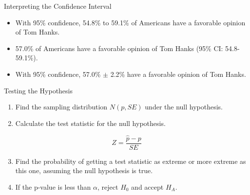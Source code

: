 \documentclass[
  ignorenonframetext,
]{beamer}
\providecommand{\tightlist}{%
  \setlength{\itemsep}{0pt}\setlength{\parskip}{0pt}}\usepackage{longtable,booktabs,array}
\begin{document}
\begin{frame}{Interpreting the Confidence Interval}
\label{interpreting-the-confidence-interval}
\begin{itemize}
\tightlist
\item
  With 95\% confidence, 54.8\% to 59.1\% of Americans have a favorable
  opinion of Tom Hanks.
\end{itemize}

\pause

\begin{itemize}
\tightlist
\item
  57.0\% of Americans have a favorable opinion of Tom Hanks (95\% CI:
  54.8-59.1\%).
\end{itemize}

\pause

\begin{itemize}
\tightlist
\item
  With 95\% confidence, 57.0\% \(\pm\) 2.2\% have a favorable opinion of
  Tom Hanks.
\end{itemize}
\end{frame}

\begin{frame}{Testing the Hypothesis}
\label{testing-the-hypothesis}
\begin{enumerate}
\tightlist
\item
  Find the sampling distribution \(N(p, SE)\) under the null hypothesis.
\end{enumerate}

\pause

\begin{enumerate}
\setcounter{enumi}{1}
\tightlist
\item
  Calculate the test statistic for the null hypothesis.
\end{enumerate}

\[
Z=\frac{\hat{p}-p}{SE}
\]

\pause

\begin{enumerate}
\setcounter{enumi}{2}
\tightlist
\item
  Find the probability of getting a test statistic as extreme or more
  extreme as this one, assuming the null hypothesis is true.
\end{enumerate}

\pause

\begin{enumerate}
\setcounter{enumi}{3}
\tightlist
\item
  If the p-value is less than \(\alpha\), reject \(H_0\) and accept
  \(H_A\).
\end{enumerate}
\end{frame}
\end{document}
